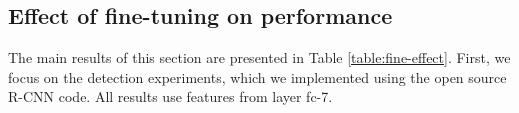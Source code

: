%

\subsection{Effect of fine-tuning on performance}
\setlength{\tabcolsep}{2pt}
\begin{table}[t!]
\begin{center}
\caption{Comparing the performance of CNNs trained from scratch, pre-trained on ImageNet, and fine-tuned. PASCAL-DET+DATA includes additional data from VOC 2012 trainval.}
\vspace{0.3em}
\label{table:fine-effect}
\end{center}
\end{table}
\setlength{\tabcolsep}{1.4pt}
The main results of this section are presented in Table \ref{table:fine-effect}.
First, we focus on the detection experiments, which we implemented using the open source R-CNN code.
All results use features from layer fc-7.

